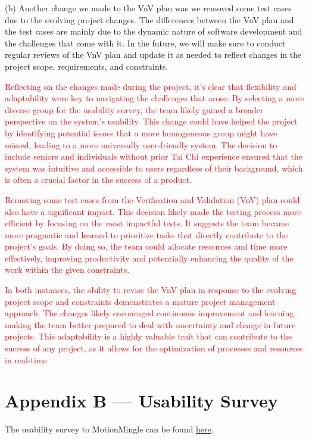 \documentclass[12pt, titlepage]{article}
\newcommand{\rt}[1]{\textcolor{red}{#1}}
\begin{document}
(b) Another change we made to the VnV plan was we removed some test cases due to
the evolving project changes. The differences between the VnV plan and the test
cases are mainly due to the dynamic nature of software development and the
challenges that come with it. In the future, we will make sure to conduct
regular reviews of the VnV plan and update it as needed to reflect changes in
the project scope, requirements, and constraints.

\rt{Reflecting on the changes made during the project, it’s clear that flexibility 
and adaptability were key to navigating the challenges that arose. By selecting a 
more diverse group for the usability survey, the team likely gained a broader 
perspective on the system's usability. This change could have helped the project 
by identifying potential issues that a more homogeneous group might have missed, 
leading to a more universally user-friendly system. The decision to include seniors 
and individuals without prior Tai Chi experience ensured that the system was 
intuitive and accessible to users regardless of their background, which is often 
a crucial factor in the success of a product.}

\rt{Removing some test cases from the Verification and Validation (VnV) plan could 
also have a significant impact. This decision likely made the testing process more 
efficient by focusing on the most impactful tests. It suggests the team became more 
pragmatic and learned to prioritize tasks that directly contribute to the project's 
goals. By doing so, the team could allocate resources and time more effectively, 
improving productivity and potentially enhancing the quality of the work within the 
given constraints.}

\rt{In both instances, the ability to revise the VnV plan in response to the evolving 
project scope and constraints demonstrates a mature project management approach. 
The changes likely encouraged continuous improvement and learning, making the team 
better prepared to deal with uncertainty and change in future projects. This 
adaptability is a highly valuable trait that can contribute to the success of any 
project, as it allows for the optimization of processes and resources in real-time.}

\section*{Appendix B --- Usability Survey}
The usability survey to MotionMingle can be found \href{https://docs.google.com/forms/d/e/1FAIpQLSchSdc_kHr98yHP8QPyWItHoP-dj_hJnuEtNByH0V2M_iDjWw/viewform}{here}.
\end{document}
